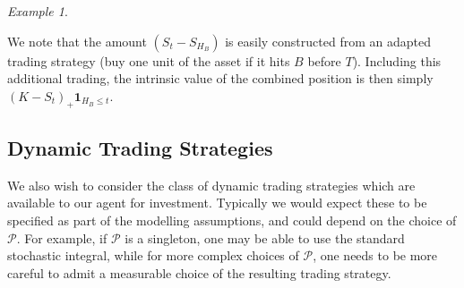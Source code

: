 \documentclass[a4paper]{amsart}
\theoremstyle{definition}
\theoremstyle{remark}
\newtheorem{example}[theorem]{Example}
\numberwithin{equation}{section}
\newcommand{\ind}{\boldsymbol{1}}
\newcommand{\Pc}{\mathcal{P}}
\newcommand{\comment}[1]{{\color{red} \bf #1}}
\begin{document}
\begin{example}
\begin{enumerate}
    We note that the amount $(S_t - S_{H_B})$ is easily constructed from an adapted trading strategy (buy one unit of the asset if it hits $B$ before $T$). Including this additional trading, the intrinsic value of the combined position is then simply $(K-S_t)_+ \ind_{H_B \le t}$.
  \end{enumerate}
\end{example}


\subsection{Dynamic Trading Strategies}

We also wish to consider the class of dynamic trading strategies which are available to our agent for investment. Typically we would expect these to be specified as part of the modelling assumptions, and could depend on the choice of $\Pc$. For example, if $\Pc$ is a singleton, one may be able to use the standard stochastic integral, while for more complex choices of $\Pc$, one needs to be more careful to admit a measurable choice of the resulting trading strategy. 
\end{document}
